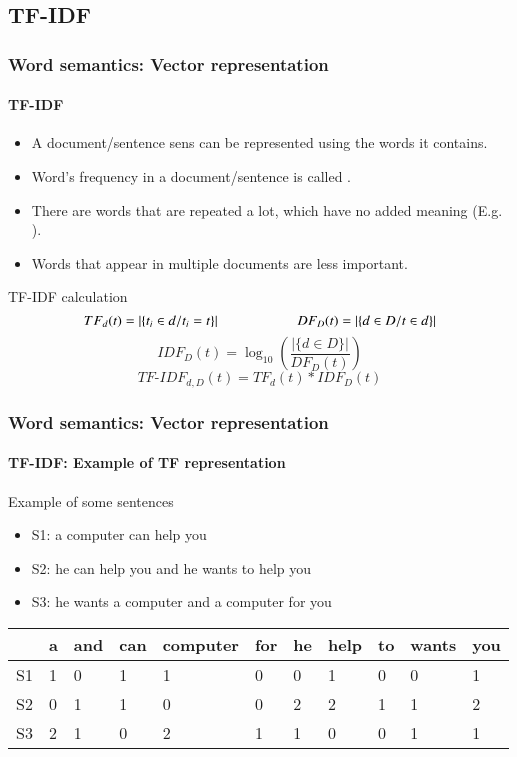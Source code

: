\documentclass[xcolor=table]{beamer}
\begin{document}
\subsection{TF-IDF}

\begin{frame}
\frametitle{Word semantics: Vector representation}
\framesubtitle{TF-IDF}

\begin{itemize}
	\item A document/sentence sens can be represented using the words it contains. 
	\item Word's frequency in a document/sentence is called .
	\item There are words that are repeated a lot, which have no added meaning (E.g. ).
	\item Words that appear in multiple documents are less important.
\end{itemize}

\begin{block}{TF-IDF calculation}
	\[
	TF_d(t) =  |\{t_i \in d / t_i = t\}|
	\hskip2cm 
	DF_D(t) = |\{d \in D / t \in d\}|
	\]
	\[IDF_D(t) = \log_{10} \left( \frac{|\{d \in D\}|}{DF_D(t)} \right)\]
	\[TF\text{-}IDF_{d, D}(t) = TF_d(t) * IDF_D(t)\]
\end{block}

\end{frame}


\begin{frame}
\frametitle{Word semantics: Vector representation}
\framesubtitle{TF-IDF: Example of TF representation}

\begin{exampleblock}{Example of some sentences}
	\begin{itemize}
		\item S1: a computer can help you
		\item S2: he can help you and he wants to help you
		\item S3: he wants a computer and a computer for you
	\end{itemize}
\end{exampleblock}

\begin{center}
	\begin{tabular}{lllllllllll}
	\hline\hline
	& a & and & can & computer & for & he & help & to & wants & you \\
	\hline
	S1 & 1 & 0 & 1 & 1 & 0 & 0 & 1 & 0 & 0 & 1\\
	S2 & 0 & 1 & 1 & 0 & 0 & 2 & 2 & 1 & 1 & 2\\
	S3 & 2 & 1 & 0 & 2 & 1 & 1 & 0 & 0 & 1 & 1\\
	\hline\hline
\end{tabular}
\end{center}

\end{frame}
\end{document}
